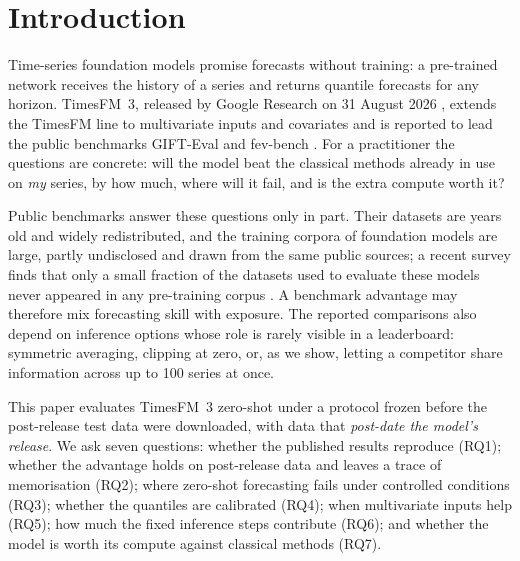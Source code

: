 \section{Introduction}

Time-series foundation models promise forecasts without training: a pre-trained network receives the history of a series and
returns quantile forecasts for any horizon. TimesFM~3, released by Google Research on 31 August 2026 \citep{jain2026timesfm3}, extends
the TimesFM line \citep{das2024timesfm} to multivariate inputs and covariates and is reported to lead the public benchmarks
GIFT-Eval and fev-bench \citep{aksu2024gifteval,shchur2025fevbench}. For a practitioner the questions are concrete: will the model
beat the classical methods already in use on \emph{my} series, by how much, where will it fail, and is the extra compute worth it?

Public benchmarks answer these questions only in part. Their datasets are years old and widely redistributed, and the training
corpora of foundation models are large, partly undisclosed and drawn from the same public sources; a recent survey finds that only a
small fraction of the datasets used to evaluate these models never appeared in any pre-training corpus \citep{meyer2025leakage}. A
benchmark advantage may therefore mix forecasting skill with exposure. The reported comparisons also depend on inference options
whose role is rarely visible in a leaderboard: symmetric averaging, clipping at zero, or, as we show, letting a competitor share
information across up to 100 series at once.

This paper evaluates TimesFM~3 zero-shot under a protocol frozen before the post-release test data were downloaded, with data that
\emph{post-date the model's release}. We ask seven questions: whether the published results reproduce (RQ1); whether the advantage
holds on post-release data and leaves a trace of memorisation (RQ2); where zero-shot forecasting fails under controlled conditions
(RQ3); whether the quantiles are calibrated (RQ4); when multivariate inputs help (RQ5); how much the fixed inference steps
contribute (RQ6); and whether the model is worth its compute against classical methods (RQ7).

